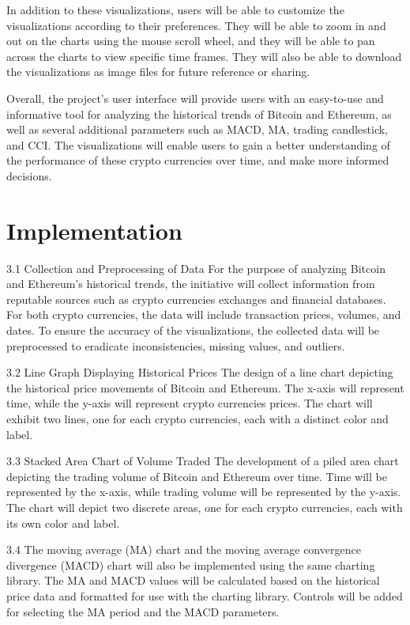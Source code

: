 \documentclass[10pt,twocolumn,a4paper]{article}
\begin{document}
In addition to these visualizations, users will be able to customize the visualizations according to their preferences. They will be able to zoom in and out on the charts using the mouse scroll wheel, and they will be able to pan across the charts to view specific time frames. They will also be able to download the visualizations as image files for future reference or sharing.

Overall, the project's user interface will provide users with an easy-to-use and informative tool for analyzing the historical trends of Bitcoin and Ethereum, as well as several additional parameters such as MACD, MA, trading candlestick, and CCI. The visualizations will enable users to gain a better understanding of the performance of these crypto currencies over time, and make more informed decisions.

\section{Implementation}

3.1 Collection and Preprocessing of Data
For the purpose of analyzing Bitcoin and Ethereum's historical trends, the initiative will collect information from reputable sources such as crypto currencies exchanges and financial databases\cite{adithyan_2021}. For both crypto currencies, the data will include transaction prices, volumes, and dates. To ensure the accuracy of the visualizations, the collected data will be preprocessed to eradicate inconsistencies, missing values, and outliers.

3.2 Line Graph Displaying Historical Prices
The design of a line chart depicting the historical price movements of Bitcoin and Ethereum. The x-axis will represent time, while the y-axis will represent crypto currencies prices. The chart will exhibit two lines, one for each crypto currencies, each with a distinct color and label.

3.3 Stacked Area Chart of Volume Traded
The development of a piled area chart depicting the trading volume of Bitcoin and Ethereum over time. Time will be represented by the x-axis, while trading volume will be represented by the y-axis. The chart will depict two discrete areas, one for each crypto currencies, each with its own color and label.

3.4 The moving average (MA) chart and the moving average convergence divergence (MACD) chart will also be implemented using the same charting library. The MA and MACD values will be calculated based on the historical price data and formatted for use with the charting library. Controls will be added for selecting the MA period and the MACD parameters.
\end{document}
